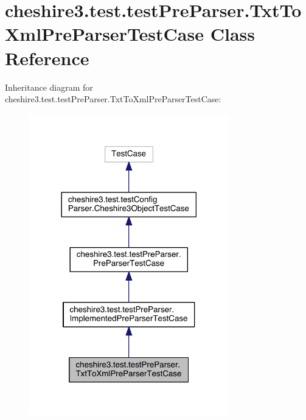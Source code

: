 \hypertarget{classcheshire3_1_1test_1_1test_pre_parser_1_1_txt_to_xml_pre_parser_test_case}{\section{cheshire3.\-test.\-test\-Pre\-Parser.\-Txt\-To\-Xml\-Pre\-Parser\-Test\-Case Class Reference}
\label{classcheshire3_1_1test_1_1test_pre_parser_1_1_txt_to_xml_pre_parser_test_case}
}


Inheritance diagram for cheshire3.\-test.\-test\-Pre\-Parser.\-Txt\-To\-Xml\-Pre\-Parser\-Test\-Case\-:
\nopagebreak
\begin{figure}[H]
\begin{center}
\leavevmode
\includegraphics[width=246pt]{classcheshire3_1_1test_1_1test_pre_parser_1_1_txt_to_xml_pre_parser_test_case__inherit__graph}
\end{center}
\end{figure}


